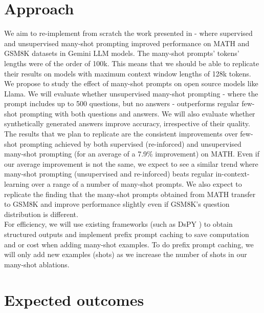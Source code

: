 \documentclass{article}
\begin{document}
\section{Approach}

We aim to re-implement from scratch the work presented in \cite{agarwal2024manyshotincontextlearning} - where supervised and unsupervised many-shot prompting improved performance on MATH and GSM8K datasets in Gemini LLM models. The many-shot prompts' tokens' lengths were of the order of 100k. This means that we should be able to replicate their results on models with maximum context window lengths of 128k tokens.\\

\noindent
We propose to study the effect of many-shot prompts on open source models like Llama. We will evaluate whether unsupervised many-shot prompting - where the prompt includes up to 500 questions, but no answers - outperforms regular few-shot prompting with both questions and answers. We will also evaluate whether synthetically generated answers improve accuracy, irrespective of their quality.\\

\noindent
The results that we plan to replicate are the consistent improvements over few-shot prompting achieved by both supervised (re-inforced) and unsupervised many-shot prompting (for an average of a 7.9\% improvement) on MATH. Even if our average improvement is not the same, we expect to see a similar trend where many-shot prompting (unsupervised and re-inforced) beats regular in-context-learning over a range of a number of many-shot prompts. We also expect to replicate the finding that the many-shot prompts obtained from MATH transfer to GSM8K and improve performance slightly even if GSM8K's question distribution is different.\\

\noindent
For efficiency, we will use existing frameworks (such as DsPY \cite{khattab2023dspycompilingdeclarativelanguage}) to obtain structured outputs and implement prefix prompt caching to save computation and \/or cost when adding many-shot examples. To do prefix prompt caching, we will only add new examples (shots) as we increase the number of shots in our many-shot ablations.


\section{Expected outcomes}
\end{document}

